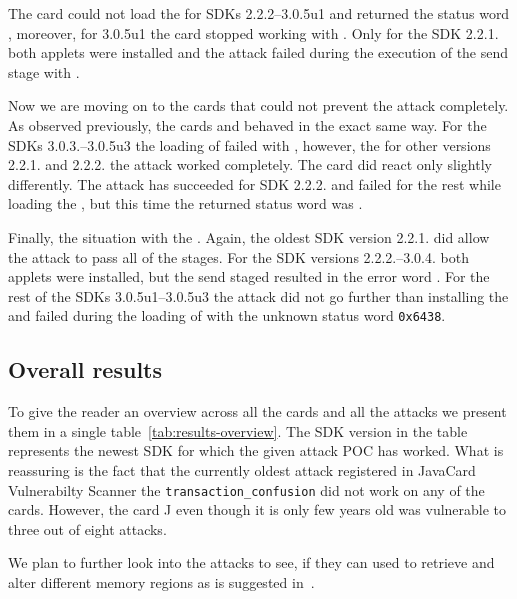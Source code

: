 \documentclass{../llncs/llncs}
\begin{document}
        The card \Dcard could not load the \appletscap for SDKs 2.2.2--3.0.5u1 and returned the status word \shortswwrongdata, moreover, for 3.0.5u1 the card stopped working with \scardenottransacted. Only for the SDK 2.2.1. both applets were installed and the attack failed during the execution of the send stage with \shortswclanotsupported.


    Now we are moving on to the cards that could not prevent the attack completely. As observed previously, the cards \Fcard and \Hcard behaved in the exact same way. For the SDKs 3.0.3.--3.0.5u3 the loading of \appletscap failed with \shortswwrongdata, however, the for other versions 2.2.1. and 2.2.2. the attack worked completely. The card \Inewcard did react only slightly differently. The attack has succeeded for SDK 2.2.2. and failed for the rest while loading the \appletscap, but this time the returned status word was \shortswconditionsnotsatisfied.

    Finally, the situation with the \Jcard. Again, the oldest SDK version 2.2.1. did allow the attack to pass all of the stages. For the SDK versions 2.2.2.--3.0.4. both applets were installed, but the send staged resulted in the error word \shortswinsnotsupported. For the rest of the SDKs 3.0.5u1--3.0.5u3 the attack did not go further than installing the \vulnscap and failed during the loading of \appletscap with the unknown status word \texttt{0x6438}.


            \subsection{Overall results}

        To give the reader an overview across all the cards and all the attacks we present them in a single table~\ref{tab:results-overview}. The SDK version in the table represents the newest SDK for which the given attack POC has worked. What is reassuring is the fact that the currently oldest attack registered in JavaCard Vulnerabilty Scanner the \texttt{transaction_confusion} did not work on any of the cards. However, the card J even though it is only few years old was vulnerable to three out of eight attacks.
    
        We plan to further look into the attacks to see, if they can used to retrieve and alter different memory regions as is suggested in~\cite{se:oracle:part1}.

\setlength{\tabcolsep}{2pt}
\renewcommand{\arraystretch}{1.2}
\end{document}
